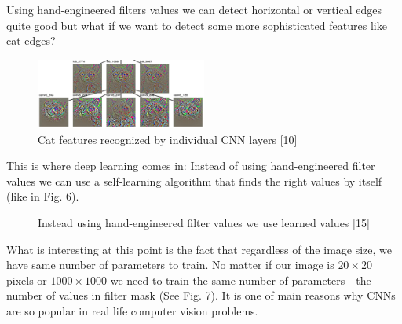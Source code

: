 \documentclass[letterpaper, 10 pt, conference]{ieeeconf}  %
\begin{document}
Using hand-engineered filters values we can detect horizontal or vertical edges quite good but what if we want to detect some more sophisticated features like cat edges? 

\begin{figure}[ht]
	\centering
    \includegraphics[width=0.5\textwidth]{Pictures/cat eatures.png}
	\caption{Cat features recognized by individual CNN layers [10]}
\end{figure}

This is where deep learning comes in: Instead of using hand-engineered filter values we can use a self-learning algorithm that finds the right values by itself (like in Fig. 6).

   \begin{figure}[!ht]
      \centering
      \caption{Instead using hand-engineered filter values we use learned values [15]}
      \label{figurelabel}
   \end{figure}


What is interesting at this point is the fact that regardless of the image size, we have same number of parameters to train. No matter if our image is $20 \times 20$ pixels or $1000 \times 1000$ we need to train the same number of parameters - the number of values in filter mask (See Fig. 7). It is one of main reasons why CNNs are so popular in real life computer vision problems.
\end{document}
